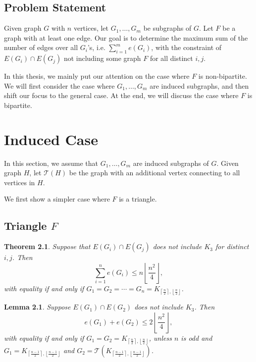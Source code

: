 \documentclass[12pt]{report}
\newtheorem{theorem}{Theorem}[chapter]
\newtheorem{lemma}{Lemma}[theorem]
\begin{document}
\section{Problem Statement}

Given graph $G$ with $n$ vertices, let $G_1, \ldots, G_m$ be subgraphs of $G$. Let $F$ be a graph
with at least one edge. Our goal is to determine the maximum sum of the number of edges over all
$G_i$'s, i.e. $\sum_{i = 1}^m e(G_i)$, with the constraint of $E(G_i) \cap E(G_j)$ not including
some graph $F$ for all distinct $i, j$. 

In this thesis, we mainly put our attention on the case where $F$ is non-bipartite. We will first
consider the case where $G_1, \ldots, G_m$ are induced subgraphs, and then shift our focus to the
general case. At the end, we will discuss the case where $F$ is bipartite.

\chapter{Induced Case}

In this section, we assume that $G_1, \ldots, G_m$ are induced subgraphs of $G$. Given graph $H$,
let $\mathcal{T}(H)$ be the graph with an additional vertex connecting to all vertices in $H$.

We first show a simpler case where $F$ is a triangle.

\section{Triangle $F$}

\begin{theorem}
  Suppose that $E(G_i) \cap E(G_j)$ does not include $K_3$ for distinct $i, j$. Then
  \[
    \sum_{i = 1}^n e(G_i) \leq n\left\lfloor\frac{n^2}{4}\right\rfloor,
  \]
  with equality if and only if $G_1 = G_2 = \cdots = G_n = K_{\left\lceil\frac{n}{2}\right\rceil,
  \left\lfloor\frac{n}{2}\right\rfloor}$.
\end{theorem}

\begin{lemma}
  Suppose $E(G_1) \cap E(G_2)$ does not include $K_3$. Then
  \[
    e(G_1) + e(G_2) \leq 2\left\lfloor\frac{n^2}{4}\right\rfloor,
  \]
  with equality if and only if $G_1 = G_2 = K_{\left\lceil\frac{n}{2}\right\rceil,
  \left\lfloor\frac{n}{2}\right\rfloor}$, unless $n$ is odd and $G_1 = K_{\left\lceil\frac{n -
  1}{2}\right\rceil, \left\lfloor\frac{n - 1}{2}\right\rfloor}$ and $G_2 =
  \mathcal{T}(K_{\left\lceil\frac{n - 1}{2}\right\rceil, \left\lfloor\frac{n -
  1}{2}\right\rfloor})$.
\end{lemma}
\end{document}
